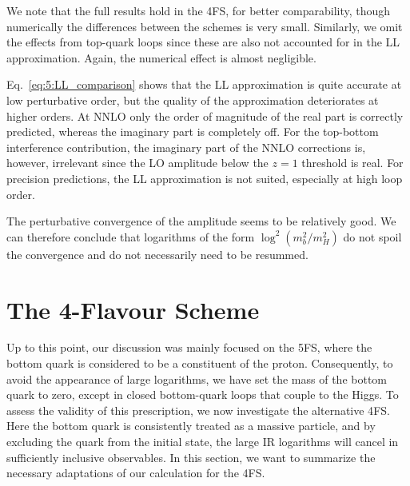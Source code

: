 We note that the full results hold in the 4\acs{FS}, for better comparability, though numerically the differences between the schemes is very small. Similarly, we omit the effects from top-quark loops since these are also not accounted for in the \acs{LL} approximation. Again, the numerical effect is almost negligible.

Eq.~\eqref{eq:5:LL_comparison} shows that the \acs{LL} approximation is quite accurate at low perturbative order, but the quality of the approximation deteriorates at higher orders. At \acs{NNLO} only the order of magnitude of the real part is correctly predicted, whereas the imaginary part is completely off. For the top-bottom interference contribution, the imaginary part of the \acs{NNLO} corrections is, however, irrelevant since the \acs{LO} amplitude below the $z=1$ threshold is real. For precision predictions, the \acs{LL} approximation is not suited, especially at high loop order.

The perturbative convergence of the amplitude seems to be relatively good. We can therefore conclude that logarithms of the form $\log^2 (m_b^2/m_H^2)$ do not spoil the convergence and do not necessarily need to be resummed.



\section{The 4-Flavour Scheme}\label{sec:5:4FS}
Up to this point, our discussion was mainly focused on the 5\acs{FS}, where the bottom quark is considered to be a constituent of the proton. Consequently, to avoid the appearance of large logarithms, we have set the mass of the bottom quark to zero, except in closed bottom-quark loops that couple to the Higgs. To assess the validity of this prescription, we now investigate the alternative 4\acs{FS}. Here the bottom quark is consistently treated as a massive particle, and by excluding the quark from the initial state, the large \acs{IR} logarithms will cancel in sufficiently inclusive observables. In this section, we want to summarize the necessary adaptations of our calculation for the 4\acs{FS}.

